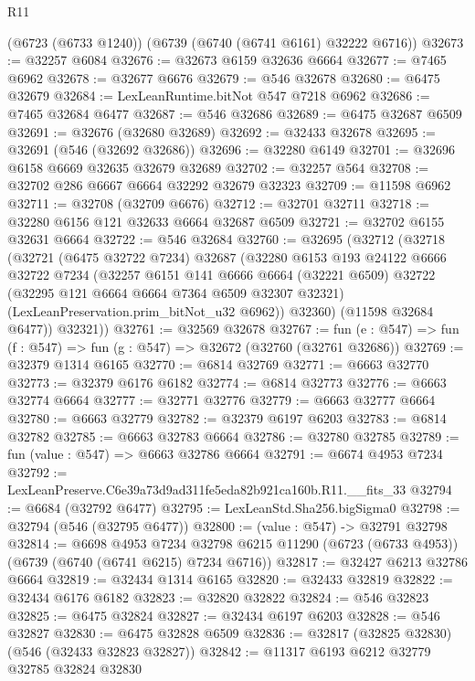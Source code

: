 \begin{lexlean}{R11}
\begin{coremodule}
    (@6723 (@6733 @1240))
    (@6739 (@6740 (@6741 @6161) @32222 @6716))
@32673 := @32257 @6084
@32676 := @32673 @6159 @32636 @6664
@32677 := @7465 @6962
@32678 := @32677 @6676
@32679 := @546 @32678
@32680 := @6475 @32679
@32684 := LexLeanRuntime.bitNot @547 @7218 @6962
@32686 := @7465 @32684 @6477
@32687 := @546 @32686
@32689 := @6475 @32687 @6509
@32691 := @32676 (@32680 @32689)
@32692 := @32433 @32678
@32695 := @32691 (@546 (@32692 @32686))
@32696 := @32280 @6149
@32701 := @32696 @6158 @6669 @32635 @32679 @32689
@32702 := @32257 @564
@32708 := @32702 @286 @6667 @6664 @32292 @32679 @32323
@32709 := @11598 @6962
@32711 := @32708 (@32709 @6676)
@32712 := @32701 @32711
@32718 := @32280 @6156 @121 @32633 @6664 @32687 @6509
@32721 := @32702 @6155 @32631 @6664
@32722 := @546 @32684
@32760 := @32695
    (@32712
      (@32718
        (@32721
          (@6475 @32722 @7234)
          @32687
          (@32280
            @6153
            @193
            @24122
            @6666
            @32722
            @7234
            (@32257
              @6151
              @141
              @6666
              @6664
              (@32221 @6509)
              @32722
              (@32295 @121 @6664 @6664 @7364 @6509 @32307 @32321)
              (LexLeanPreservation.prim_bitNot_u32 @6962))
            @32360)
          (@11598 @32684 @6477))
        @32321))
@32761 := @32569 @32678
@32767 := fun (e : @547) => fun (f : @547) => fun (g : @547) => @32672 (@32760 (@32761 @32686))
@32769 := @32379 @1314 @6165
@32770 := @6814 @32769
@32771 := @6663 @32770
@32773 := @32379 @6176 @6182
@32774 := @6814 @32773
@32776 := @6663 @32774 @6664
@32777 := @32771 @32776
@32779 := @6663 @32777 @6664
@32780 := @6663 @32779
@32782 := @32379 @6197 @6203
@32783 := @6814 @32782
@32785 := @6663 @32783 @6664
@32786 := @32780 @32785
@32789 := fun (value : @547) => @6663 @32786 @6664
@32791 := @6674 @4953 @7234
@32792 := LexLeanPreserve.C6e39a73d9ad311fe5eda82b921ca160b.R11.__fits_33
@32794 := @6684 (@32792 @6477)
@32795 := LexLeanStd.Sha256.bigSigma0
@32798 := @32794 (@546 (@32795 @6477))
@32800 := (value : @547) -> @32791 @32798
@32814 := @6698
    @4953
    @7234
    @32798
    @6215
    @11290
    (@6723 (@6733 @4953))
    (@6739 (@6740 (@6741 @6215) @7234 @6716))
@32817 := @32427 @6213 @32786 @6664
@32819 := @32434 @1314 @6165
@32820 := @32433 @32819
@32822 := @32434 @6176 @6182
@32823 := @32820 @32822
@32824 := @546 @32823
@32825 := @6475 @32824
@32827 := @32434 @6197 @6203
@32828 := @546 @32827
@32830 := @6475 @32828 @6509
@32836 := @32817 (@32825 @32830) (@546 (@32433 @32823 @32827))
@32842 := @11317 @6193 @6212 @32779 @32785 @32824 @32830

\end{coremodule}
\end{lexlean}
